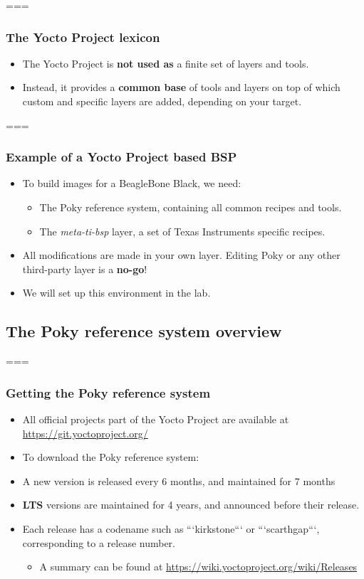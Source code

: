 === 
  \frametitle{The Yocto Project lexicon}
  \begin{itemize}
    \item The Yocto Project is \textbf{not used as} a finite set of
          layers and tools.
    \item Instead, it provides a \textbf{common base} of tools and
          layers on top of which custom and specific layers are added,
          depending on your target.
  \end{itemize}


=== 
  \frametitle{Example of a Yocto Project based BSP}
  \begin{itemize}
    \item To build images for a BeagleBone Black, we need:
    \begin{itemize}
      \item The Poky reference system, containing all common recipes
            and tools.
      \item The {\em meta-ti-bsp} layer, a set of Texas Instruments
            specific recipes.
    \end{itemize}
    \item All modifications are made in your own layer.  Editing Poky or
      any other third-party layer is a \textbf{no-go}!
    \item We will set up this environment in the lab.
  \end{itemize}


\subsection{The Poky reference system overview}

=== 
  \frametitle{Getting the Poky reference system}
  \begin{itemize}
    \item All official projects part of the Yocto Project are
          available at \url{https://git.yoctoproject.org/}
    \item To download the Poky reference system: \\
    \item A new version is released every 6 months, and maintained for 7 months
    \item \textbf{LTS} versions are maintained for 4 years, and announced before their release.
    \item Each release has a codename such as ```kirkstone``` or ```scarthgap```,
	  corresponding to a release number.
		  \begin{itemize}
			  \item A summary can be found at \url{https://wiki.yoctoproject.org/wiki/Releases}
		  \end{itemize}
  \end{itemize}


